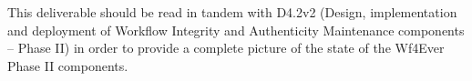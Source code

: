 \documentclass[a4paper, twoside, 11pt]{article}
\begin{document}
This deliverable should be read in tandem with D4.2v2 (Design,
implementation and deployment of Workflow Integrity and Authenticity
Maintenance components -- Phase II) in order to provide a complete
picture of the state of the Wf4Ever Phase II components.

\clearpage

\tableofcontents
\clearpage

\clearpage
\sloppy


% 



% 


\appendix
\clearpage
{}


\label{lastpage}
\end{document}
